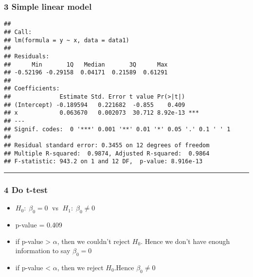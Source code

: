 \documentclass[
]{article}
\begin{document}
\hypertarget{simple-linear-model}{%
\subsubsection{\texorpdfstring{\textbf{3 Simple linear
model}}{3 Simple linear model}}\label{simple-linear-model}}

\begin{verbatim}
## 
## Call:
## lm(formula = y ~ x, data = data1)
## 
## Residuals:
##      Min       1Q   Median       3Q      Max 
## -0.52196 -0.29158  0.04171  0.21589  0.61291 
## 
## Coefficients:
##              Estimate Std. Error t value Pr(>|t|)    
## (Intercept) -0.189594   0.221682  -0.855    0.409    
## x            0.063670   0.002073  30.712 8.92e-13 ***
## ---
## Signif. codes:  0 '***' 0.001 '**' 0.01 '*' 0.05 '.' 0.1 ' ' 1
## 
## Residual standard error: 0.3455 on 12 degrees of freedom
## Multiple R-squared:  0.9874, Adjusted R-squared:  0.9864 
## F-statistic: 943.2 on 1 and 12 DF,  p-value: 8.916e-13
\end{verbatim}

\begin{center}\rule{0.5\linewidth}{0.5pt}\end{center}

\hypertarget{do-t-test}{%
\subsubsection{\texorpdfstring{\textbf{4 Do
t-test}}{4 Do t-test}}\label{do-t-test}}

\begin{itemize}
\item
  \(H_0:\;\beta_0=0\;\) vs \(\;H_1:\;\beta_0\neq 0\)
\item
  p-value = 0.409
\item
  if p-value \textgreater{} \(\alpha\), then we couldn't reject \(H_0\).
  Hence we don't have enough information to say \(\beta_0=0\)
\item
  if p-value \textless{} \(\alpha\), then we reject \(H_0\).Hence
  \(\beta_0\neq0\)
\end{itemize}
\end{document}
